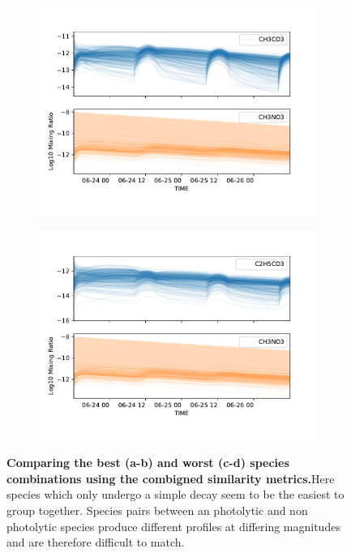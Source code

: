 \begin{figure}[H]
  \begin{subfigure}[t]{.5\textwidth}
    \centering
    \includegraphics[width=\textwidth]{ensemble/CH3CO3-CH3NO3.pdf}
    \caption{}
  \end{subfigure}%
  \begin{subfigure}[t]{.5\textwidth}
    \centering
    \includegraphics[width=\textwidth]{ensemble/C2H5CO3-CH3NO3.pdf}
    \caption{}
  \end{subfigure}%
  \caption{\textbf{Comparing the best (a-b) and worst (c-d) species combinations using the combigned similarity metrics.}Here species which only undergo a simple decay seem to be the easiest to group together. Species pairs between an photolytic and non photolytic species produce different profiles at differing magnitudes and are therefore difficult to match.}
  \label{fig:bestworst}
  \end{figure}






